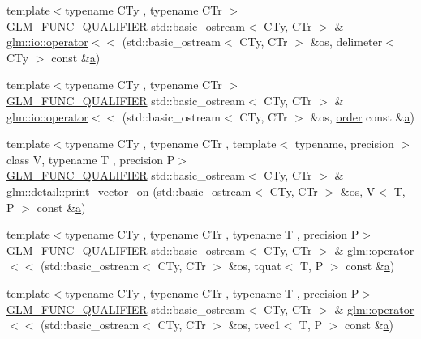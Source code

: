 \begin{DoxyCompactItemize}
\item 
{\footnotesize template$<$typename C\+Ty , typename C\+Tr $>$ }\\\mbox{\hyperlink{setup_8hpp_a33fdea6f91c5f834105f7415e2a64407}{G\+L\+M\+\_\+\+F\+U\+N\+C\+\_\+\+Q\+U\+A\+L\+I\+F\+I\+ER}} std\+::basic\+\_\+ostream$<$ C\+Ty, C\+Tr $>$ \& \mbox{\hyperlink{namespaceglm_1_1io_a7c5774d5b7b03ff810042e141d893082}{glm\+::io\+::operator$<$$<$}} (std\+::basic\+\_\+ostream$<$ C\+Ty, C\+Tr $>$ \&os, delimeter$<$ C\+Ty $>$ const \&\mbox{\hyperlink{glad_8h_ac8729153468b5dcf13f971b21d84d4e5}{a}})
\item 
{\footnotesize template$<$typename C\+Ty , typename C\+Tr $>$ }\\\mbox{\hyperlink{setup_8hpp_a33fdea6f91c5f834105f7415e2a64407}{G\+L\+M\+\_\+\+F\+U\+N\+C\+\_\+\+Q\+U\+A\+L\+I\+F\+I\+ER}} std\+::basic\+\_\+ostream$<$ C\+Ty, C\+Tr $>$ \& \mbox{\hyperlink{namespaceglm_1_1io_a4dab7c825ecbd918643ed9fc9ef4ecb6}{glm\+::io\+::operator$<$$<$}} (std\+::basic\+\_\+ostream$<$ C\+Ty, C\+Tr $>$ \&os, \mbox{\hyperlink{glad_8h_a4240946665c1034f7ba768c9bf5af8ec}{order}} const \&\mbox{\hyperlink{glad_8h_ac8729153468b5dcf13f971b21d84d4e5}{a}})
\item 
{\footnotesize template$<$typename C\+Ty , typename C\+Tr , template$<$ typename, precision $>$ class V, typename T , precision P$>$ }\\\mbox{\hyperlink{setup_8hpp_a33fdea6f91c5f834105f7415e2a64407}{G\+L\+M\+\_\+\+F\+U\+N\+C\+\_\+\+Q\+U\+A\+L\+I\+F\+I\+ER}} std\+::basic\+\_\+ostream$<$ C\+Ty, C\+Tr $>$ \& \mbox{\hyperlink{namespaceglm_1_1detail_a96bee64577b69e3a541b02df0f591cc1}{glm\+::detail\+::print\+\_\+vector\+\_\+on}} (std\+::basic\+\_\+ostream$<$ C\+Ty, C\+Tr $>$ \&os, V$<$ T, P $>$ const \&\mbox{\hyperlink{glad_8h_ac8729153468b5dcf13f971b21d84d4e5}{a}})
\item 
{\footnotesize template$<$typename C\+Ty , typename C\+Tr , typename T , precision P$>$ }\\\mbox{\hyperlink{setup_8hpp_a33fdea6f91c5f834105f7415e2a64407}{G\+L\+M\+\_\+\+F\+U\+N\+C\+\_\+\+Q\+U\+A\+L\+I\+F\+I\+ER}} std\+::basic\+\_\+ostream$<$ C\+Ty, C\+Tr $>$ \& \mbox{\hyperlink{group__gtx__io_ga038d37e8d7965dc7bfae5dc23e4140af}{glm\+::operator$<$$<$}} (std\+::basic\+\_\+ostream$<$ C\+Ty, C\+Tr $>$ \&os, tquat$<$ T, P $>$ const \&\mbox{\hyperlink{glad_8h_ac8729153468b5dcf13f971b21d84d4e5}{a}})
\item 
{\footnotesize template$<$typename C\+Ty , typename C\+Tr , typename T , precision P$>$ }\\\mbox{\hyperlink{setup_8hpp_a33fdea6f91c5f834105f7415e2a64407}{G\+L\+M\+\_\+\+F\+U\+N\+C\+\_\+\+Q\+U\+A\+L\+I\+F\+I\+ER}} std\+::basic\+\_\+ostream$<$ C\+Ty, C\+Tr $>$ \& \mbox{\hyperlink{group__gtx__io_ga171289d1671b75e033a1b078c68a7460}{glm\+::operator$<$$<$}} (std\+::basic\+\_\+ostream$<$ C\+Ty, C\+Tr $>$ \&os, tvec1$<$ T, P $>$ const \&\mbox{\hyperlink{glad_8h_ac8729153468b5dcf13f971b21d84d4e5}{a}})

\end{DoxyCompactItemize}
